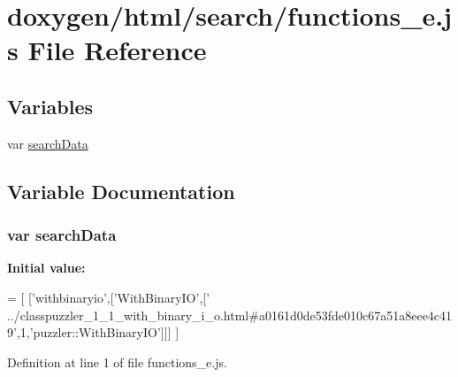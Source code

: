 \hypertarget{a00097}{}\section{doxygen/html/search/functions\+\_\+e.js File Reference}
\label{a00097}
\subsection*{Variables}
\begin{DoxyCompactItemize}
\item 
var \hyperlink{a00097_ad01a7523f103d6242ef9b0451861231e}{search\+Data}
\end{DoxyCompactItemize}


\subsection{Variable Documentation}
\hypertarget{a00097_ad01a7523f103d6242ef9b0451861231e}{}
\subsubsection[{search\+Data}]{\setlength{\rightskip}{0pt plus 5cm}var search\+Data}\label{a00097_ad01a7523f103d6242ef9b0451861231e}
{\bfseries Initial value\+:}
\begin{DoxyCode}
=
[
  [\textcolor{stringliteral}{'withbinaryio'},[\textcolor{stringliteral}{'WithBinaryIO'},[\textcolor{stringliteral}{'
      ../classpuzzler\_1\_1\_with\_binary\_i\_o.html#a0161d0de53fde010c67a51a8eee4c419'},1,\textcolor{stringliteral}{'puzzler::WithBinaryIO'}]]]
]
\end{DoxyCode}


Definition at line 1 of file functions\+\_\+e.\+js.


